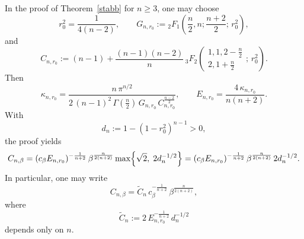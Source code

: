 \documentclass[a4paper,10pt]{amsart}
\begin{document}
\begin{numrem}
\label{rem:explicit_Cnalpha}
In the proof of Theorem~\ref{stabb} for $n\ge3$, one may choose
\[
r_0^2=\frac1{4(n-2)},\qquad
G_{n,r_0}:={}_2F_1\!\left(\frac n2,n;\frac{n+2}{2};\,r_0^2\right),
\]
and
\[
C_{n,r_0}:=(n-1)+\frac{(n-1)(n-2)}{n}\,
{}_3F_2\!\left(\begin{array}{c}
1,1,2-\frac n2\\[2pt]
2,1+\frac n2
\end{array};\,r_0^2\right).
\]
Then
\[
\kappa_{n,r_0}
=
\frac{n\,\pi^{n/2}}
{2\,(n-1)^2\,\Gamma(\frac n2)\,G_{n,r_0}\,C_{n,r_0}^{\frac{n-2}{2}}},
\qquad
E_{n,r_0}=\frac{4\,\kappa_{n,r_0}}{n(n+2)}.
\]
With
\[
d_n:=1-(1-r_0^2)^{n-1}>0,
\]
the proof yields
\[
C_{n,\beta}
=
(c_\beta E_{n,r_0})^{-\frac1{n+2}}\,
\beta^{\frac{n}{2(n+2)}}
\max\Bigl\{\sqrt2,\;2d_n^{-1/2}\Bigr\}
=
(c_\beta E_{n,r_0})^{-\frac1{n+2}}\,
\beta^{\frac{n}{2(n+2)}}
\,2d_n^{-1/2}.
\]
In particular, one may write
\[
C_{n,\beta}
=
\widetilde C_n\,
c_\beta^{-\frac1{n+2}}\,
\beta^{\frac{n}{2(n+2)}},
\]
where
\[
\widetilde C_n
:=
2\,E_{n,r_0}^{-\frac1{n+2}}\,d_n^{-1/2}
\]
depends only on $n$.
\end{numrem}
\end{document}

